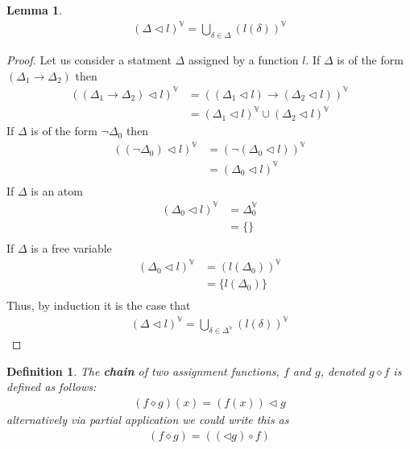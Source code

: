 \documentclass{article}
\newtheorem{lem}{Lemma}
\newtheorem{defin}{Definition}
\begin{document}
\begin{lem}
\begin{align*}
(\Delta\lhd l)^\mathbb{V}
= \bigcup_{\delta \in \Delta} (l(\delta))^\mathbb{V}
\end{align*}
\end{lem}
\begin{proof}
Let us consider a statment $\Delta$ assigned by a function $l$.
If $\Delta$ is of the form $(\Delta_1\rightarrow\Delta_2)$ then
\begin{align*}
((\Delta_1\rightarrow\Delta_2)\lhd l)^\mathbb{V}
&= ((\Delta_1\lhd l)\rightarrow(\Delta_2\lhd l))^\mathbb{V} \tag{Definition of Assignment} \\
&= (\Delta_1\lhd l)^\mathbb{V}\cup(\Delta_2\lhd l)^\mathbb{V} \tag{Definition of Free Variable Set}
\end{align*}
If $\Delta$ is of the form $\neg \Delta_0$ then
\begin{align*}
((\neg \Delta_0)\lhd l)^\mathbb{V}
&= (\neg (\Delta_0\lhd l))^\mathbb{V} \tag{Definition of Assignment} \\
&= (\Delta_0\lhd l)^\mathbb{V} \tag{Definition of Free Variable Set} \\
\end{align*}
If $\Delta$ is an atom
\begin{align*}
(\Delta_0\lhd l)^\mathbb{V}
&= \Delta_0^\mathbb{V} \tag{Definition of Assignment} \\
&= \{\} \tag{Definition of Free Variable Set} \\
\end{align*}
If $\Delta$ is a free variable
\begin{align*}
(\Delta_0\lhd l)^\mathbb{V}
&= (l(\Delta_0))^\mathbb{V} \tag{Definition of Assignment} \\
&= \{l(\Delta_0)\} \tag{Definition of Free Variable Set} \\
\end{align*}
Thus, by induction it is the case that 
\begin{align*}
(\Delta\lhd l)^\mathbb{V}
= \bigcup_{\delta \in \Delta^\mathbb{V}} (l(\delta))^\mathbb{V}
\end{align*}
\end{proof}

\begin{defin}
The \textbf{chain} of two assignment functions, $f$ and $g$, denoted $g \diamond f$ is defined as follows:
\begin{align*}
(f \diamond g) (x) = (f (x)) \lhd g
\end{align*}
alternatively via partial application we could write this as
\begin{align*}
(f \diamond g) = ((\lhd g)\circ f)
\end{align*}
\end{defin}
\end{document}
